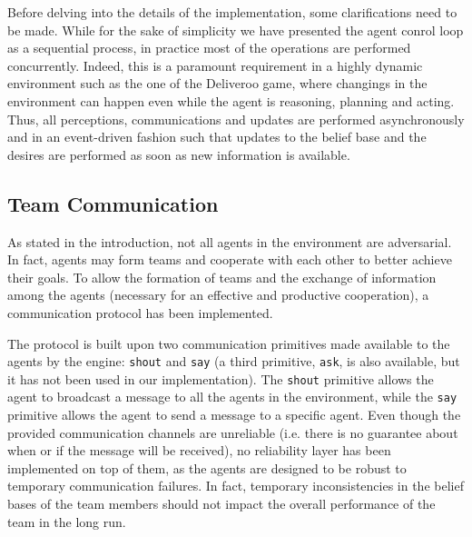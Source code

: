 Before delving into the details of the implementation, some clarifications need to be made. While for the sake of simplicity we have presented the agent conrol loop as a sequential process, in practice most of the operations are performed concurrently. Indeed, this is a paramount requirement in a highly dynamic environment such as the one of the Deliveroo game, where changings in the environment can happen even while the agent is reasoning, planning and acting. Thus, all perceptions, communications and updates are performed asynchronously and in an event-driven fashion such that updates to the belief base and the desires are performed as soon as new information is available.

\subsection{Team Communication}

As stated in the introduction, not all agents in the environment are adversarial. In fact, agents may form teams and cooperate with each other to better achieve their goals. To allow the formation of teams and the exchange of information among the agents (necessary for an effective and productive cooperation), a communication protocol has been implemented.

The protocol is built upon two communication primitives made available to the agents by the engine: \texttt{shout} and \texttt{say} (a third primitive, \texttt{ask}, is also available, but it has not been used in our implementation). The \texttt{shout} primitive allows the agent to broadcast a message to all the agents in the environment, while the \texttt{say} primitive allows the agent to send a message to a specific agent. Even though the provided communication channels are unreliable (i.e. there is no guarantee about when or if the message will be received), no reliability layer has been implemented on top of them, as the agents are designed to be robust to temporary communication failures. In fact, temporary inconsistencies in the belief bases of the team members should not impact the overall performance of the team in the long run.

